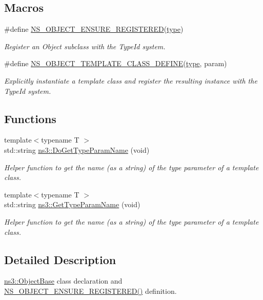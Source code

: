 \subsection*{Macros}
\begin{DoxyCompactItemize}
\item 
\#define \hyperlink{group__object_gada1b0bfc04abdba718621b5095c87678}{N\+S\+\_\+\+O\+B\+J\+E\+C\+T\+\_\+\+E\+N\+S\+U\+R\+E\+\_\+\+R\+E\+G\+I\+S\+T\+E\+R\+ED}(\hyperlink{visualizer-ideas_8txt_add98db9e15e2a58cf2b57623e7aa893a}{type})
\begin{DoxyCompactList}\small\item\em Register an Object subclass with the Type\+Id system. \end{DoxyCompactList}\item 
\#define \hyperlink{group__object_ga5e357e83d3947e972525eab919bd0e90}{N\+S\+\_\+\+O\+B\+J\+E\+C\+T\+\_\+\+T\+E\+M\+P\+L\+A\+T\+E\+\_\+\+C\+L\+A\+S\+S\+\_\+\+D\+E\+F\+I\+NE}(\hyperlink{visualizer-ideas_8txt_add98db9e15e2a58cf2b57623e7aa893a}{type},  param)
\begin{DoxyCompactList}\small\item\em Explicitly instantiate a template class and register the resulting instance with the Type\+Id system. \end{DoxyCompactList}\end{DoxyCompactItemize}
\subsection*{Functions}
\begin{DoxyCompactItemize}
\item 
{\footnotesize template$<$typename T $>$ }\\std\+::string \hyperlink{namespacens3_ab604ea71e8e214a067685528d419535a}{ns3\+::\+Do\+Get\+Type\+Param\+Name} (void)
\begin{DoxyCompactList}\small\item\em Helper function to get the name (as a string) of the type parameter of a template class. \end{DoxyCompactList}\item 
{\footnotesize template$<$typename T $>$ }\\std\+::string \hyperlink{namespacens3_a8de7bd07d5aa30d97a0323df31f33b85}{ns3\+::\+Get\+Type\+Param\+Name} (void)
\begin{DoxyCompactList}\small\item\em Helper function to get the name (as a string) of the type parameter of a template class. \end{DoxyCompactList}\end{DoxyCompactItemize}


\subsection{Detailed Description}
\hyperlink{classns3_1_1ObjectBase}{ns3\+::\+Object\+Base} class declaration and \hyperlink{group__object_gada1b0bfc04abdba718621b5095c87678}{N\+S\+\_\+\+O\+B\+J\+E\+C\+T\+\_\+\+E\+N\+S\+U\+R\+E\+\_\+\+R\+E\+G\+I\+S\+T\+E\+R\+E\+D()} definition. 